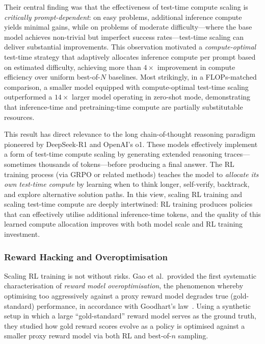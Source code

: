 Their central finding was that the effectiveness of test-time compute scaling
is \emph{critically prompt-dependent}: on easy problems, additional inference
compute yields minimal gains, while on problems of moderate difficulty---where
the base model achieves non-trivial but imperfect success rates---test-time
scaling can deliver substantial improvements.  This observation motivated a
\emph{compute-optimal} test-time strategy that adaptively allocates inference
compute per prompt based on estimated difficulty, achieving more than $4\times$
improvement in compute efficiency over uniform best-of-$N$ baselines.  Most
strikingly, in a FLOPs-matched comparison, a smaller model equipped with
compute-optimal test-time scaling outperformed a $14\times$ larger model
operating in zero-shot mode, demonstrating that inference-time and
pretraining-time compute are partially substitutable resources.

This result has direct relevance to the long chain-of-thought reasoning
paradigm pioneered by DeepSeek-R1 and OpenAI's o1.  These models effectively
implement a form of test-time compute scaling by generating extended reasoning
traces---sometimes thousands of tokens---before producing a final answer.  The
RL training process (via GRPO or related methods) teaches the model to
\emph{allocate its own test-time compute} by learning when to think longer,
self-verify, backtrack, and explore alternative solution paths.  In this view,
scaling RL training and scaling test-time compute are deeply intertwined: RL
training produces policies that can effectively utilise additional inference-time
tokens, and the quality of this learned compute allocation improves with both
model scale and RL training investment.

\subsubsection{Reward Hacking and Overoptimisation}

Scaling RL training is not without risks.  Gao et al.\ provided the first
systematic characterisation of \emph{reward model overoptimisation}, the
phenomenon whereby optimising too aggressively against a proxy reward model
degrades true (gold-standard) performance, in accordance with Goodhart's
law~\cite{gao2023scaling}.  Using a synthetic setup in which a large
``gold-standard'' reward model serves as the ground truth, they studied how gold
reward scores evolve as a policy is optimised against a smaller proxy reward
model via both RL and best-of-$n$ sampling.

